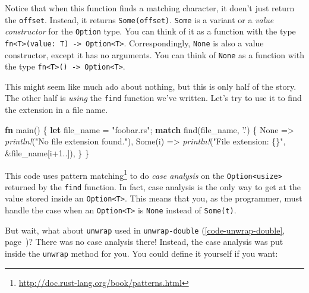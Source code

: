 \documentclass[a4paper,]{book}
\renewcommand*{\hyperref}[2][\ar]{%
  \def\ar{#2}%
  #2 (\autoref{#1}, page~\pageref{#1})}
\newenvironment{Shaded}{\begin{snugshade}}{\end{snugshade}}
\newcommand{\KeywordTok}[1]{\textcolor[rgb]{0.13,0.29,0.53}{\textbf{{#1}}}}
\newcommand{\DecValTok}[1]{\textcolor[rgb]{0.00,0.00,0.81}{{#1}}}
\newcommand{\ConstantTok}[1]{\textcolor[rgb]{0.00,0.00,0.00}{{#1}}}
\newcommand{\CharTok}[1]{\textcolor[rgb]{0.31,0.60,0.02}{{#1}}}
\newcommand{\StringTok}[1]{\textcolor[rgb]{0.31,0.60,0.02}{{#1}}}
\newcommand{\PreprocessorTok}[1]{\textcolor[rgb]{0.56,0.35,0.01}{\textit{{#1}}}}
\newcommand{\NormalTok}[1]{{#1}}
\renewcommand{\href}[2]{#2\footnote{\url{#1}}}
\begin{document}
Notice that when this function finds a matching character, it doen't
just return the \texttt{offset}. Instead, it returns
\texttt{Some(offset)}. \texttt{Some} is a variant or a \emph{value
constructor} for the \texttt{Option} type. You can think of it as a
function with the type
\texttt{fn\textless{}T\textgreater{}(value:\ T)\ -\textgreater{}\ Option\textless{}T\textgreater{}}.
Correspondingly, \texttt{None} is also a value constructor, except it
has no arguments. You can think of \texttt{None} as a function with the
type
\texttt{fn\textless{}T\textgreater{}()\ -\textgreater{}\ Option\textless{}T\textgreater{}}.

This might seem like much ado about nothing, but this is only half of
the story. The other half is \emph{using} the \texttt{find} function
we've written. Let's try to use it to find the extension in a file name.

\begin{Shaded}
\begin{Highlighting}[]
\KeywordTok{fn} \NormalTok{main() \{}
    \KeywordTok{let} \NormalTok{file_name = }\StringTok{"foobar.rs"}\NormalTok{;}
    \KeywordTok{match} \NormalTok{find(file_name, }\CharTok{'.'}\NormalTok{) \{}
        \ConstantTok{None} \NormalTok{=> }\PreprocessorTok{println!}\NormalTok{(}\StringTok{"No file extension found."}\NormalTok{),}
        \ConstantTok{Some}\NormalTok{(i) => }\PreprocessorTok{println!}\NormalTok{(}\StringTok{"File extension: \{\}"}\NormalTok{, &file_name[i+}\DecValTok{1.}\NormalTok{.]),}
    \NormalTok{\}}
\NormalTok{\}}
\end{Highlighting}
\end{Shaded}

This code uses
\href{http://doc.rust-lang.org/book/patterns.html}{pattern matching} to
do \emph{case analysis} on the
\texttt{Option\textless{}usize\textgreater{}} returned by the
\texttt{find} function. In fact, case analysis is the only way to get at
the value stored inside an \texttt{Option\textless{}T\textgreater{}}.
This means that you, as the programmer, must handle the case when an
\texttt{Option\textless{}T\textgreater{}} is \texttt{None} instead of
\texttt{Some(t)}.

But wait, what about \texttt{unwrap} used in
\hyperref[code-unwrap-double]{\texttt{unwrap-double}}? There was no case
analysis there! Instead, the case analysis was put inside the
\texttt{unwrap} method for you. You could define it yourself if you
want:
\end{document}
